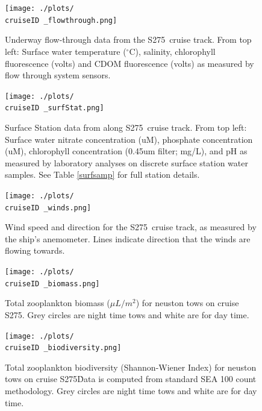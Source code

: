 \documentclass[letterpaper,11pt]{article}
\newcommand{\cruiseID}{S275}
\begin{document}
\begin{figure}[t]
\centering
\texttt{[image: ./plots/\\cruiseID \_flowthrough.png]}
\caption[Underway flow-through data from the \cruiseID\ cruise track]{Underway flow-through data from the \cruiseID\ cruise track. From top left: Surface water temperature ($^{\circ}$C), salinity, chlorophyll fluorescence (volts) and CDOM fluorescence (volts) as measured by flow through system sensors.}
\label{hourly}
\end{figure}

\begin{figure}[t]
\centering
\texttt{[image: ./plots/\\cruiseID \_surfStat.png]}
\caption[Surface Station data from along \cruiseID\ cruise track]{Surface Station data from along \cruiseID\ cruise track. From top left: Surface water nitrate concentration (uM), phosphate concentration (uM), chlorophyll concentration (0.45um filter; mg/L), and pH as measured by laboratory analyses on discrete surface station water samples. See Table \ref{surfsamp} for full station details.}
\label{surfstat}
\end{figure}

\begin{figure}[t]
\centering
\texttt{[image: ./plots/\\cruiseID \_winds.png]}
\caption[Wind vector summary]{Wind speed and direction for the \cruiseID\ cruise track, as measured by the ship’s anemometer. Lines indicate direction that the winds are flowing towards.}
\label{winds}
\end{figure}

\begin{figure}[t]
\centering
\texttt{[image: ./plots/\\cruiseID \_biomass.png]}
\caption[Zooplankton biomass]{Total zooplankton biomass ($\mu L/m^2$) for neuston tows on cruise \cruiseID. Grey circles are night time tows and white are for day time.}
\label{biomass}
\end{figure}

\begin{figure}[t]
\centering
\texttt{[image: ./plots/\\cruiseID \_biodiversity.png]}
\caption[Zooplankton Biodiversity]{Total zooplankton biodiversity (Shannon-Wiener Index) for neuston tows on cruise \cruiseID\. Data is computed from standard SEA 100 count methodology. Grey circles are night time tows and white are for day time.}
\label{biodiversity}
\end{figure}
\end{document}
